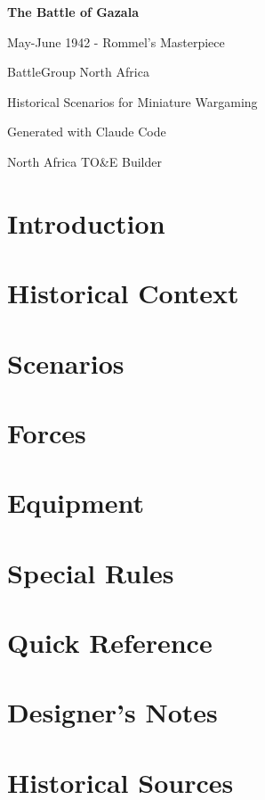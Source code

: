 \documentclass[11pt,letterpaper,twoside]{book}
\begin{document}
\begin{titlepage}
    \centering
    \vspace*{2cm}
    {\Huge\bfseries The Battle of Gazala\par}
    \vspace{1cm}
    {\Large May-June 1942 - Rommel's Masterpiece\par}
    \vspace{2cm}
    {\Large BattleGroup North Africa\par}
    {\large Historical Scenarios for Miniature Wargaming\par}
    \vfill
    {\large Generated with Claude Code\par}
    {\large North Africa TO&E Builder\par}
    \vspace{1cm}
\end{titlepage}

\tableofcontents


\chapter{Introduction}

\chapter{Historical Context}

\chapter{Scenarios}

\chapter{Forces}

\chapter{Equipment}

\chapter{Special Rules}

\appendix
\chapter{Quick Reference}

\chapter{Designer's Notes}

\chapter{Historical Sources}
\end{document}
